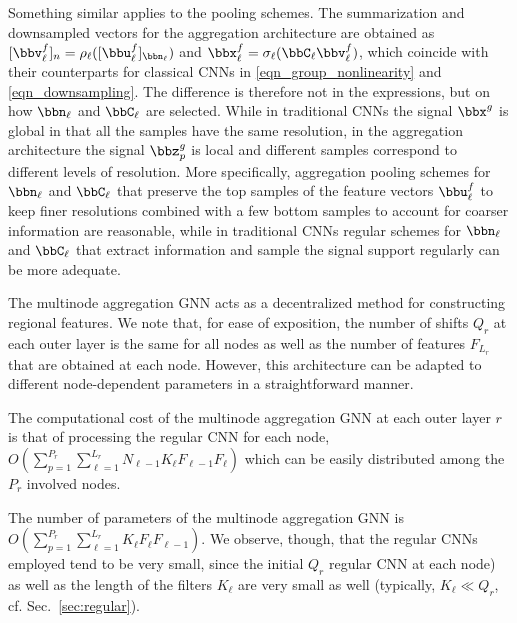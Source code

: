  Something similar applies to the pooling schemes. The summarization and downsampled vectors for the aggregation architecture are obtained as $[\bbv^{f}_{\ell}]_n 
= \rho_{\ell}( [\bbu_{\ell}^f]_{\bbn_\ell})$ and $\bbx^{f}_{\ell} =  \sigma_\ell (\bbC_{\ell}\bbv^{f}_{\ell} )$, which coincide with their counterparts for classical CNNs in \eqref{eqn_group_nonlinearity} and \eqref{eqn_downsampling}. The difference is therefore not in the expressions, but on how $\bbn_{\ell}$ and $\bbC_{\ell}$ are selected. 
While in traditional CNNs the signal $\bbx^{g}$ is global in that all the samples have the same resolution, in the aggregation architecture the signal $\bbz_p^{g}$ is local and different samples correspond to different levels of resolution. More specifically, aggregation pooling schemes for $\bbn_{\ell}$ and $\bbC_{\ell}$ that preserve the top samples of the feature vectors $\bbu^f_\ell$ to keep finer resolutions combined with a few bottom samples to account for coarser information are reasonable, while in traditional CNNs regular schemes for $\bbn_{\ell}$ and $\bbC_{\ell}$ that extract information and sample the signal support regularly can be more adequate.

 The multinode aggregation GNN acts as a decentralized method for constructing regional features. We note that, for ease of exposition, the number of shifts $Q_{r}$ at each outer layer is the same for all nodes as well as the number of features $F_{L_{r}}$ that are obtained at each node. However, this architecture can be adapted to different node-dependent parameters in a straightforward manner.

 The computational cost of the multinode aggregation GNN at each outer layer $r$ is that of processing the regular CNN for each node, $O (\sum_{p=1}^{P_{r}} \sum_{\ell=1}^{L_{r}} N_{\ell-1} K_{\ell} F_{\ell-1} F_{\ell})$ which can be easily distributed among the $P_{r}$ involved nodes.

 The number of parameters of the multinode aggregation GNN is $O(\sum_{p=1}^{P_{r}} \sum_{\ell=1}^{L_{r}} K_{\ell} F_{\ell} F_{\ell-1})$.  We observe, though, that the regular CNNs employed tend to be very small, since the initial $Q_{r}$ regular CNN at each node) as well as the length of the filters $K_{\ell}$ are very small as well (typically, $K_{\ell} \ll Q_{r}$, cf. Sec.~\ref{sec:regular}).

